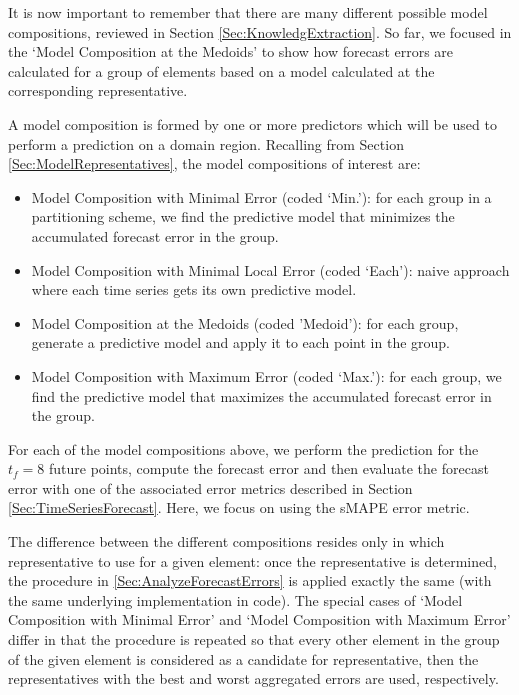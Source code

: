 It is now important to remember that there are many different possible model compositions, reviewed in Section \ref{Sec:KnowledgExtraction}. So far, we focused in the `Model Composition at the Medoids' to show how forecast errors are calculated for a group of elements based on a model calculated at the corresponding representative. 

A model composition is formed by one or more predictors which will be used to perform a prediction on a domain region. Recalling from Section \ref{Sec:ModelRepresentatives}, the model compositions of interest are:

\begin{itemize}%
	\item Model Composition with Minimal Error (coded `Min.'): for each group in a partitioning scheme, we find the predictive model that minimizes the accumulated forecast error in the group. 
	\item Model Composition with Minimal Local Error (coded `Each'): naive approach where each time series gets its own predictive model.
	\item Model Composition at the Medoids (coded 'Medoid'): for each group, generate a predictive model and apply it to each point in the group.
	\item Model Composition with Maximum Error (coded `Max.'): for each group, we find the predictive model that maximizes the accumulated forecast error in the group.
\end{itemize}

For each of the model compositions above, we perform the prediction for the $t_f =8$ future points, compute the forecast error and then evaluate the forecast error with one of the associated error metrics described in Section \ref{Sec:TimeSeriesForecast}. Here, we focus on using the sMAPE error metric.

The difference between the different compositions resides only in which representative to use for a given element: once the representative is determined, the procedure in \ref{Sec:AnalyzeForecastErrors} is applied exactly the same (with the same underlying implementation in code). The special cases of `Model Composition with Minimal Error' and `Model Composition with Maximum Error' differ in that the procedure is repeated so that every other element in the group of the given element is considered as a candidate for representative, then the representatives with the best and worst aggregated errors are used, respectively.

